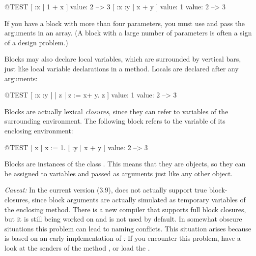 \documentclass[a4paper,10pt,twoside]{book}
\begin{document}
\begin{code}{@TEST}
[ :x | 1 + x ] value: 2 --> 3
[ :x :y | x + y ] value: 1 value: 2 --> 3
\end{code}

If you have a block with more than four parameters, you must use  and pass the arguments in an array.
(A block with a large number of parameters is often a sign of a design problem.)

Blocks may also declare local variables, which are surrounded by vertical bars, just like local variable declarations in a method.
Locals are declared after any arguments:

\begin{code}{@TEST}
[ :x :y | | z | z := x+ y. z ] value: 1 value: 2 --> 3
\end{code}

Blocks are actually lexical \emph{closures}, since they can refer to variables of the surrounding environment.
The following block refers to the variable  of its enclosing environment:

\begin{code}{@TEST}
| x |
x := 1.
[ :y | x + y ] value: 2 --> 3
\end{code}

Blocks are instances of the class .
This means that they are objects, so they can be assigned to variables and passed as arguments just like any other object.

\emph{Caveat:}
In the current version (3.9), \pharo does not actually support true block-closures, since block arguments are actually simulated as temporary variables of the enclosing method. There is a new compiler that supports full block closures, but it is still being worked on and is not used by default.
In somewhat obscure situations this problem can lead to naming conflicts.
This situation arises because \pharo is based on an early implementation of \st.
If you encounter this problem, have a look at the senders of the method , or load the .
\end{document}
